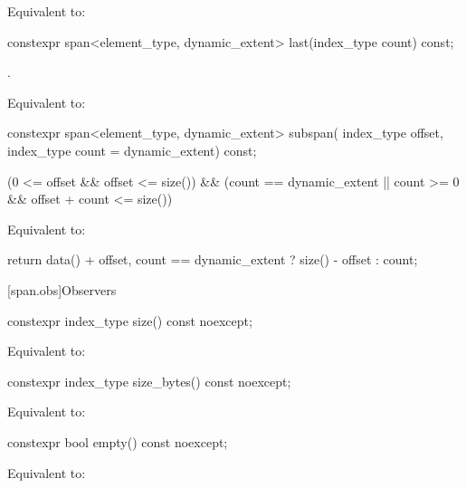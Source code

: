 \begin{codeblock}
\begin{codeblock}
\begin{codeblock}
\begin{itemdescr}
\pnum
\effects
Equivalent to: 
\end{itemdescr}

%
\begin{itemdecl}
constexpr span<element_type, dynamic_extent> last(index_type count) const;
\end{itemdecl}
\begin{itemdescr}
\pnum
\requires
{}.

\pnum
\effects
Equivalent to: 
\end{itemdescr}

%
\begin{itemdecl}
constexpr span<element_type, dynamic_extent> subspan(
  index_type offset, index_type count = dynamic_extent) const;
\end{itemdecl}
\begin{itemdescr}
\pnum
\requires
\begin{codeblock}
(0 <= offset && offset <= size())
&& (count == dynamic_extent || count >= 0 && offset + count <= size())
\end{codeblock}

\pnum
\effects
Equivalent to:
\begin{codeblock}
return {data() + offset, count == dynamic_extent ? size() - offset : count};
\end{codeblock}
\end{itemdescr}

[span.obs]{Observers}

%
\begin{itemdecl}
constexpr index_type size() const noexcept;
\end{itemdecl}
\begin{itemdescr}
\pnum
\effects
Equivalent to: 
\end{itemdescr}

%
\begin{itemdecl}
constexpr index_type size_bytes() const noexcept;
\end{itemdecl}
\begin{itemdescr}
\pnum
\effects
Equivalent to: 
\end{itemdescr}

%
\begin{itemdecl}
constexpr bool empty() const noexcept;
\end{itemdecl}
\begin{itemdescr}
\pnum
\effects
Equivalent to: 
\end{itemdescr}


\end{codeblock}
\end{codeblock}
\end{codeblock}
